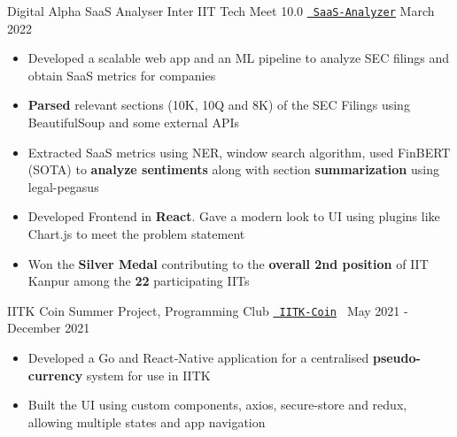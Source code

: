 
\begin{cventries}
  \vspace{-2mm}
\hrulefill
\vspace{1mm}

\cventry
{Digital Alpha SaaS Analyser}
{Inter IIT Tech Meet 10.0}
{\texttt{\href{https://docs.google.com/presentation/d/1zgRrYwIt0juemg0FGrPXUjsLX2gD7f9wmv1iU7j4Gxo/edit?usp=sharing}{\faLink{} SaaS-Analyzer}}}
{March 2022}
{
\begin{itemize}
  \item Developed a scalable web app and an ML pipeline to analyze SEC filings and obtain SaaS metrics for companies
  \item \textbf{Parsed} relevant sections (10K, 10Q and 8K) of the SEC Filings using BeautifulSoup and some external APIs
  \item Extracted SaaS metrics using NER, window search algorithm, used FinBERT (SOTA) to \textbf{analyze sentiments} along with section \textbf{summarization} using legal-pegasus
  \item Developed Frontend in \textbf{React}. Gave a modern look to UI using plugins like Chart.js to meet the problem statement
  \item Won the \textbf{Silver Medal} contributing to the \textbf{overall 2nd position} of IIT Kanpur among the \textbf{22} participating IITs
\end{itemize}
  }
\cventry
  {IITK Coin}
  {Summer Project, Programming Club}
  {\texttt{\href{https://github.com/abhishekshree/iitk-coin}{\faGithub{}}} \texttt{\href{https://github.com/abhishekshree/iitk-coin-native-app}{\faGithub{} IITK-Coin} }}
  {May 2021 - December 2021}
  {
    \begin{itemize}
      \item Developed a Go and React‑Native application for a centralised \textbf{pseudo-currency} system for use in IITK
      \item Built the UI using custom components, axios, secure-store and redux, allowing multiple states and app navigation

\end{itemize}}
\end{cventries}
